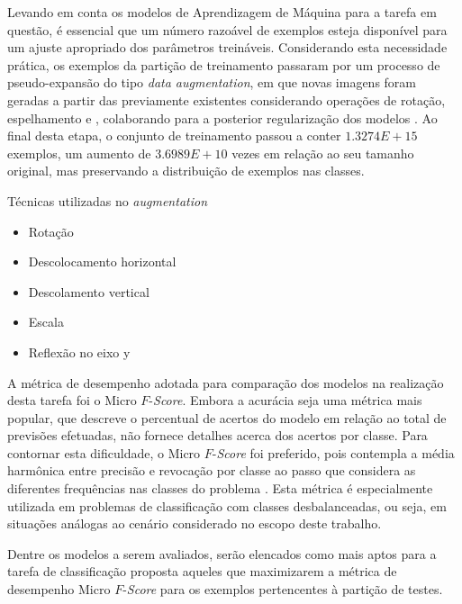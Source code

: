 Levando em conta os modelos de Aprendizagem de Máquina para a tarefa em questão, é essencial que um número razoável de exemplos esteja disponível para um ajuste apropriado dos parâmetros treináveis. Considerando esta necessidade prática, os exemplos da partição de treinamento passaram por um processo de pseudo-expansão do tipo \emph{data augmentation}, em que novas imagens foram geradas a partir das previamente existentes considerando operações de rotação, espelhamento e , colaborando para a posterior regularização dos modelos \cite{Chollet:Livro}. Ao final desta etapa, o conjunto de treinamento passou a conter $1.3274E+15$ exemplos, um aumento de $3.6989E+10$ vezes em relação ao seu tamanho original, mas preservando a distribuição de exemplos nas classes.

Técnicas utilizadas no \textit{augmentation}
\begin{itemize}
	\item Rotação
	\item Descolocamento horizontal
	\item Descolamento vertical
	\item Escala
	\item Reflexão no eixo y
\end{itemize}

A métrica de desempenho adotada para comparação dos modelos na realização desta tarefa foi o Micro $F$-\emph{Score}. Embora a acurácia seja uma métrica mais popular, que descreve o percentual de acertos do modelo em relação ao total de previsões efetuadas, não fornece detalhes acerca dos acertos por classe. Para contornar esta dificuldade, o Micro $F$-\emph{Score} foi preferido, pois contempla a média harmônica entre precisão e revocação por classe ao passo que considera as diferentes frequências nas classes do problema \cite{Kubat:Livro}. Esta métrica é especialmente utilizada em problemas de classificação com classes desbalanceadas, ou seja, em situações análogas ao cenário considerado no escopo deste trabalho.

Dentre os modelos a serem avaliados, serão elencados como mais aptos para a tarefa de classificação proposta aqueles que maximizarem a métrica de desempenho Micro $F$-\emph{Score}  para os exemplos pertencentes à partição de testes.
